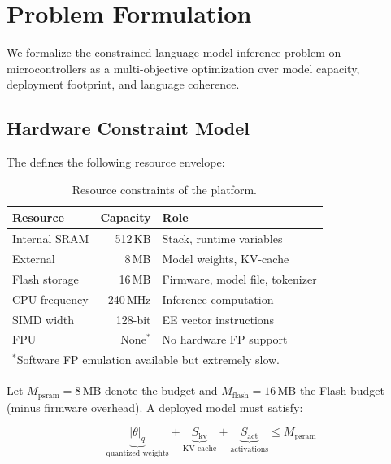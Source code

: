 \section{Problem Formulation}
\label{sec:problem}

We formalize the constrained language model inference problem on
microcontrollers as a multi-objective optimization over model capacity,
deployment footprint, and language coherence.

\subsection{Hardware Constraint Model}

The \espss{} defines the following resource envelope:

\begin{table}[H]
\centering
\caption{Resource constraints of the \espss{} platform.}
\label{tab:constraints}
\small
\begin{tabular}{lrl}
\toprule
\textbf{Resource} & \textbf{Capacity} & \textbf{Role} \\
\midrule
Internal SRAM   & 512\,KB  & Stack, runtime variables \\
External \psram{} & 8\,MB & Model weights, KV-cache \\
Flash storage   & 16\,MB  & Firmware, model file, tokenizer \\
CPU frequency   & 240\,MHz & Inference computation \\
SIMD width      & 128-bit  & EE vector instructions \\
FPU             & None$^*$ & No hardware FP support \\
\bottomrule
\multicolumn{3}{l}{\footnotesize $^*$Software FP emulation available but extremely slow.}
\end{tabular}
\end{table}

Let $M_{\text{psram}} = 8$\,MB denote the \psram{} budget and
$M_{\text{flash}} = 16$\,MB the Flash budget (minus firmware overhead).
A deployed model must satisfy:

\begin{equation}
\underbrace{|\theta|_q}_{\text{quantized weights}}
+ \underbrace{S_{\text{kv}}}_{\text{KV-cache}}
+ \underbrace{S_{\text{act}}}_{\text{activations}}
\leq M_{\text{psram}}
\label{eq:memory_constraint}
\end{equation}

